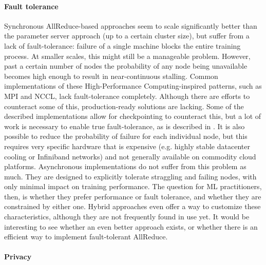 \paragraph{Fault tolerance}

Synchronous AllReduce-based approaches seem to scale significantly better than the parameter server approach (up to a certain cluster size), but suffer from a lack of fault-tolerance: failure of a single machine blocks the entire training process. At smaller scales, this might still be a manageable problem. However, past a certain number of nodes the probability of any node being unavailable becomes high enough to result in near-continuous stalling. Common implementations of these High-Performance Computing-inspired patterns, such as MPI and NCCL, lack fault-tolerance completely. Although there are efforts to counteract some of this, production-ready solutions are lacking. Some of the described implementations allow for checkpointing to counteract this, but a lot of work is necessary to enable true fault-tolerance, as is described in \citet{Amatya2017}. It is also possible to reduce the probability of failure for each individual node, but this requires very specific hardware that is expensive (e.g. highly stable datacenter cooling or Infiniband networks) and not generally available on commodity cloud platforms.
Asynchronous implementations do not suffer from this problem as much. They are designed to explicitly tolerate straggling and failing nodes, with only minimal impact on training performance. The question for ML practitioners, then, is whether they prefer performance or fault tolerance, and whether they are constrained by either one. Hybrid approaches even offer a way to customize these characteristics, although they are not frequently found in use yet. It would be interesting to see whether an even better approach exists, or whether there is an efficient way to implement fault-tolerant AllReduce.

\paragraph{Privacy}

